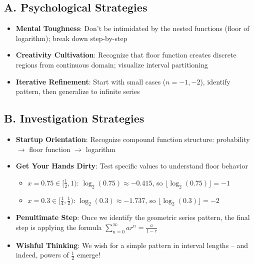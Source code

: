 \documentclass[11pt]{article}
\begin{document}
\begin{strategicbox}
\subsection*{A. Psychological Strategies}
\begin{itemize}[leftmargin=*]
    \item \textbf{Mental Toughness}: Don't be intimidated by the nested functions (floor of logarithm); break down step-by-step
    
    \item \textbf{Creativity Cultivation}: Recognize that floor function creates discrete regions from continuous domain; visualize interval partitioning
    
    \item \textbf{Iterative Refinement}: Start with small cases ($n=-1, -2$), identify pattern, then generalize to infinite series
\end{itemize}

\subsection*{B. Investigation Strategies}
\begin{itemize}[leftmargin=*]
    \item \textbf{Startup Orientation}: Recognize compound function structure: probability $\rightarrow$ floor function $\rightarrow$ logarithm
    
    \item \textbf{Get Your Hands Dirty}: Test specific values to understand floor behavior
    \begin{itemize}
        \item $x = 0.75 \in [\frac{1}{2}, 1)$: $\log_2(0.75) \approx -0.415$, so $\lfloor\log_2(0.75)\rfloor = -1$
        \item $x = 0.3 \in [\frac{1}{4}, \frac{1}{2})$: $\log_2(0.3) \approx -1.737$, so $\lfloor\log_2(0.3)\rfloor = -2$
    \end{itemize}
    
    \item \textbf{Penultimate Step}: Once we identify the geometric series pattern, the final step is applying the formula $\sum_{n=0}^{\infty} ar^n = \frac{a}{1-r}$
    
    \item \textbf{Wishful Thinking}: We wish for a simple pattern in interval lengths -- and indeed, powers of $\frac{1}{2}$ emerge!
    

\end{itemize}
\end{strategicbox}
\end{document}
